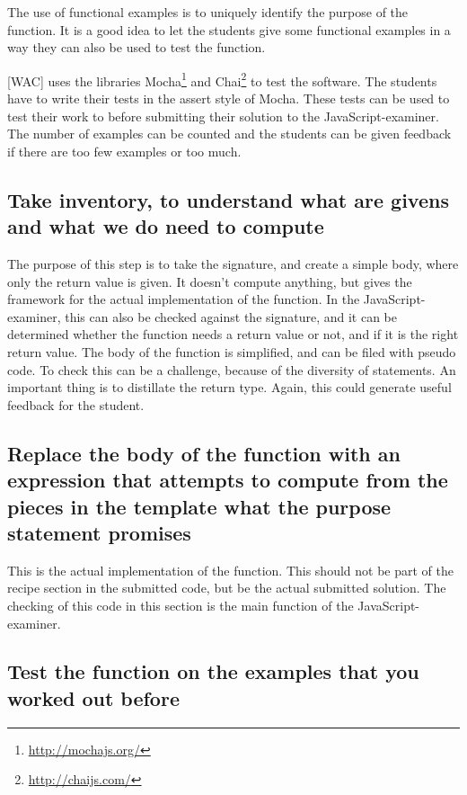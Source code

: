 \documentclass{article}
\begin{document}
The use of functional examples is to uniquely identify the purpose of the
function.
It is a good idea to let the students give some functional examples in a way
they can also be used to test the function.

[WAC] uses the libraries Mocha\footnote{\url{http://mochajs.org/}} and
Chai\footnote{\url{http://chaijs.com/}} to test the software.
The students have to write their tests in the assert style of Mocha.
These tests can be used to test their work to before submitting their solution
to the JavaScript-examiner.
The number of examples can be counted and the students can be given feedback if
there are too few examples or too much.


\subsection{Take inventory, to understand what are givens and what we do need to compute}

The purpose of this step is to take the signature, and create a simple body,
where only the return value is given.
It doesn't compute anything, but gives the framework for the actual
implementation of the function.
In the JavaScript-examiner, this can also be checked against the signature, and
it can be determined whether the function needs a return value or not, and if it
is the right return value. The body of the function is simplified, and can be
filed with pseudo code.
To check this can be a challenge, because of the diversity of statements. An
important thing is to distillate the return type.
Again, this could generate useful feedback for the student.


\subsection{Replace the body of the function with an expression that attempts to compute from the pieces in the template what the purpose statement promises}

This is the actual implementation of the function.
This should not be part of the recipe section in the submitted code, but be the
actual submitted solution.
The checking of this code in this section is the main function of the
JavaScript-examiner.


\subsection{Test the function on the examples that you worked out before}
\end{document}
